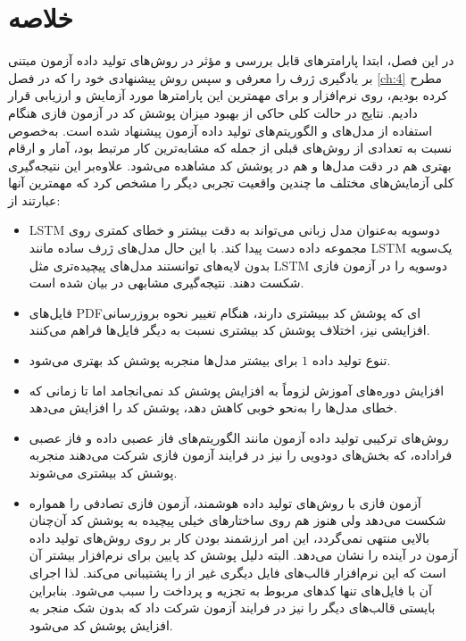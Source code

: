 \section{خلاصه}
در این فصل، ابتدا پارامترهای قابل بررسی و مؤثر در روش‌های تولید داده آزمون مبتنی بر یادگیری ژرف را معرفی و سپس روش پیشنهادی خود را که در فصل \ref{ch:4} مطرح کرده بودیم، روی نرم‌افزار  و برای مهمترین این پارامترها مورد آزمایش و ارزیابی قرار دادیم. نتایج در حالت کلی حاکی از بهبود میزان پوشش کد در آزمون فازی  هنگام استفاده از مدل‌های و الگوریتم‌های تولید داده آزمون پیشنهاد شده است. به‌خصوص نسبت به تعدادی از روش‌های قبلی از جمله 
\cite{Godefroid:2017:LML:3155562.3155573}
که مشابه‌ترین کار مرتبط بود، آمار و ارقام بهتری هم در دقت مدل‌ها و هم در پوشش کد مشاهده می‌شود. علاوه‌بر این نتیجه‌گیری کلی آزمایش‌های مختلف ما چندین واقعیت تجربی دیگر را مشخص کرد که مهمترین آنها عبارتند از:

\begin{itemize}
	\item {
\gls{LSTM} 
دوسویه به‌عنوان مدل زبانی می‌تواند به دقت بیشتر و خطای کمتری روی مجموعه داده دست پیدا کند.	با این حال مدل‌های ژرف ساده مانند \gls{LSTM} یک‌سویه بدون لایه‌های  توانستند مدل‌های پیچیده‌تری مثل \gls{LSTM} دوسویه را در آزمون فازی شکست دهند. نتیجه‌گیری مشابهی در 
\cite{DBLP:journals/corr/abs-1711-04596}
بیان شده است.

}
\item{
فایل‌های \gls{PDF}ای که پوشش کد ببیشتری دارند، هنگام تغییر نحوه بروزرسانی افزایشی نیز، اختلاف پوشش کد بیشتری نسبت به دیگر فایل‌ها فراهم می‌کنند.

}

	\item {
 تنوع تولید داده $1$ برای بیشتر مدل‌ها منجربه پوشش کد بهتری می‌شود.
}
\item{
افزایش دوره‌های آموزش لزوماً به افزایش پوشش کد نمی‌انجامد اما تا زمانی که خطای مدل‌ها را به‌نحو خوبی کاهش دهد، پوشش کد را افزایش می‌دهد.
}

\item{
	روش‌های ترکیبی تولید داده آزمون مانند الگوریتم‌های فاز عصبی داده و فاز عصبی فراداده، که بخش‌های دودویی را نیز در فرایند آزمون فازی شرکت می‌دهند منجربه پوشش کد بیشتری می‌شوند.
}

\item{
	آزمون فازی با روش‌های تولید داده هوشمند، آزمون فازی تصادفی را همواره شکست می‌دهد ولی هنوز هم روی ساختارهای خیلی پیچیده به پوشش کد آن‌چنان بالایی منتهی نمی‌گردد، این امر ارزشمند بودن کار بر روی روش‌های تولید داده آزمون در آینده را نشان‌ می‌دهد. البته دلیل پوشش کد پایین برای نرم‌افزار 
	بیشتر آن است که این نرم‌افزار قالب‌های فایل دیگری غیر از 
	را پشتیبانی می‌کند. لذا اجرای آن با فایل‌های 
	 تنها کدهای مربوط به تجزیه و پرداخت 
	 را سبب می‌شود. بنابراین بایستی قالب‌های دیگر را نیز در فرایند آزمون شرکت داد که بدون شک منجر به افزایش پوشش کد می‌شود.
}


\end{itemize}

